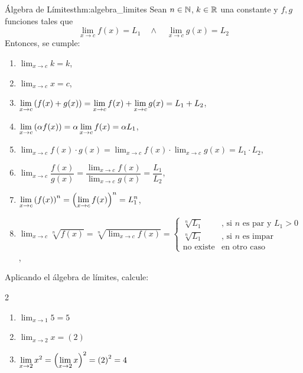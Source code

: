 \begin{theorem}{Álgebra de Límites}{thm:algebra_limites}
  Sean $n \in \mathbb{N}$, $k \in \mathbb{R}$ una constante y $f,g$ funciones tales que
  \[ \lim_{x \to c}{f(x)} = L_1 \quad \wedge \quad \lim_{x \to c}{g(x)} = L_2 \]
  Entonces, se cumple:
  \begin{enumerate}
    \item $\displaystyle{\lim_{x \to c}{k} = k}$,
    \item $\displaystyle{\lim_{x \to c}{x} = c}$,
    \item $\displaystyle{\lim_{x \to c}{\left(f(x) + g(x) \right)} = \lim_{x \to c}{f(x)} + \lim_{x \to c}{g(x)} = L_1 + L_2  }$,
    \item $\displaystyle{\lim_{x \to c}{\left(\alpha f(x) \right)} = \alpha \lim_{x \to c}{f(x)} = \alpha L_1 }$,
    \item $\displaystyle{\lim_{x \to c}{f(x) \cdot g(x)} = \lim_{x \to c}{f(x)} \cdot \lim_{x \to c}{g(x)} = L_1 \cdot L_2 }$,
    \item $\displaystyle{\lim_{x \to c}{\dfrac{f(x)}{g(x)}} = \dfrac{\displaystyle \lim_{x \to c}{f(x)}}{\displaystyle \lim_{x \to c}{g(x)}} = \dfrac{L_1}{L_2} }$,
    \item $\displaystyle{\lim_{x \to c}{\left(f(x) \right)^n} = \left(\lim_{x \to c}{f(x)} \right)^n = L_1 ^n}$,
    \item $\displaystyle{\lim_{x \to c}{\sqrt[n]{f(x)}} = \sqrt[n]{\lim_{x \to c}{f(x)}} = \begin{cases} \sqrt[n]{L_1} & \text{, si } n \text{ es par y } L_1>0 \\ \sqrt[n]{L_1} & \text{, si } n \text{ es impar} \\ \text{no existe} & \text{en otro caso} \end{cases} }$,
  \end{enumerate}
\end{theorem}

\begin{example}{}{}
  Aplicando el álgebra de límites, calcule:
  \begin{multicols}{2}
    \begin{enumerate}
      \item $\displaystyle{ \lim_{x \to 1 }{5} = 5 }$
      \item $\displaystyle{ \lim_{x \to 2 }{x} = (2) }$
      \item $\displaystyle{ \lim_{x \to 2 }{x^2} = \left(\lim_{x \to 2}{x} \right)^2 = \left(2 \right)^2 =4}$
    \end{enumerate}
  \end{multicols}
\end{example}

